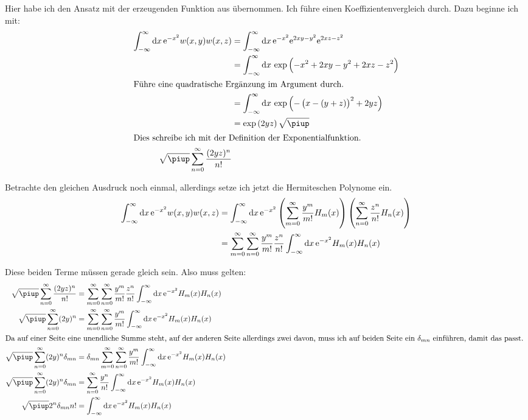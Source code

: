 Hier habe ich den Ansatz mit der erzeugenden Funktion aus
\cite[§5]{koeppel-hermite_beiblatt} übernommen. Ich führe einen
Koeffizientenvergleich durch. Dazu beginne ich mit:
\begin{align*}
	\int_{-\infty}^\infty \dif x \, \ee^{-x^2}
	w(x, y) w(x, z)
	&= \int_{-\infty}^\infty \dif x \, \ee^{-x^2}
	\ee^{2xy-y^2} \ee^{2xz-z^2} \\
	&= \int_{-\infty}^\infty \dif x \,
	\exp\del{-x^2 + 2xy-y^2 + 2xz-z^2} \\
	\intertext{%
		Führe eine quadratische Ergänzung im Argument durch.
	}
	&= \int_{-\infty}^\infty \dif x \,
	\exp\del{-\del{x - (y+z)}^2 + 2yz} \\
	&= \exp\del{2yz} \sqrt\piup \\
	\intertext{%
		Dies schreibe ich mit der Definition der Exponentialfunktion.
	}
	\sqrt\piup \sum_{n=0}^\infty \frac{(2yz)^n}{n!}
\end{align*}

Betrachte den gleichen Ausdruck noch einmal, allerdings setze ich jetzt die
Hermiteschen Polynome ein.
\begin{align*}
	\int_{-\infty}^\infty \dif x \, \ee^{-x^2}
	w(x, y) w(x, z)
	&= \int_{-\infty}^\infty \dif x \, \ee^{-x^2}
	\del{\sum_{m=0}^\infty \frac{y^m}{m!} H_m(x)}
	\del{\sum_{n=0}^\infty \frac{z^n}{n!} H_n(x)} \\
	&= \sum_{m=0}^\infty \sum_{n=0}^\infty \frac{y^m}{m!} \frac{z^n}{n!}
	\int_{-\infty}^\infty \dif x \, \ee^{-x^2} H_m(x) H_n(x)
\end{align*}

Diese beiden Terme müssen gerade gleich sein. Also muss gelten:
\begin{align*}
	\sqrt\piup \sum_{n=0}^\infty \frac{(2yz)^n}{n!}
	&= \sum_{m=0}^\infty \sum_{n=0}^\infty \frac{y^m}{m!} \frac{z^n}{n!}
	\int_{-\infty}^\infty \dif x \, \ee^{-x^2} H_m(x) H_n(x) \\
	\sqrt\piup \sum_{n=0}^\infty (2y)^n
	&= \sum_{m=0}^\infty \sum_{n=0}^\infty \frac{y^m}{m!}
	\int_{-\infty}^\infty \dif x \, \ee^{-x^2} H_m(x) H_n(x) \\
	\intertext{%
		Da auf einer Seite eine unendliche Summe steht, auf der anderen Seite
		allerdings zwei davon, muss ich auf beiden Seite ein $\delta_{mn}$
		einführen, damit das passt.
	}
	\sqrt\piup \sum_{n=0}^\infty (2y)^n \delta_{mn}
	&= \delta_{mn} \sum_{m=0}^\infty \sum_{n=0}^\infty \frac{y^m}{m!}
	\int_{-\infty}^\infty \dif x \, \ee^{-x^2} H_m(x) H_n(x) \\
	\sqrt\piup \sum_{n=0}^\infty (2y)^n \delta_{mn}
	&= \sum_{n=0}^\infty \frac{y^n}{n!}
	\int_{-\infty}^\infty \dif x \, \ee^{-x^2} H_m(x) H_n(x) \\
	\sqrt\piup 2^n \delta_{mn} n!
	&= \int_{-\infty}^\infty \dif x \, \ee^{-x^2} H_m(x) H_n(x)
\end{align*}

